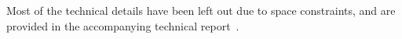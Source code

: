 Most of the technical details have been left out due to space
constraints, and are provided in the accompanying technical report~\cite{colosl-tr14}.

%
%
%
%
%
%
%
%
%
%



